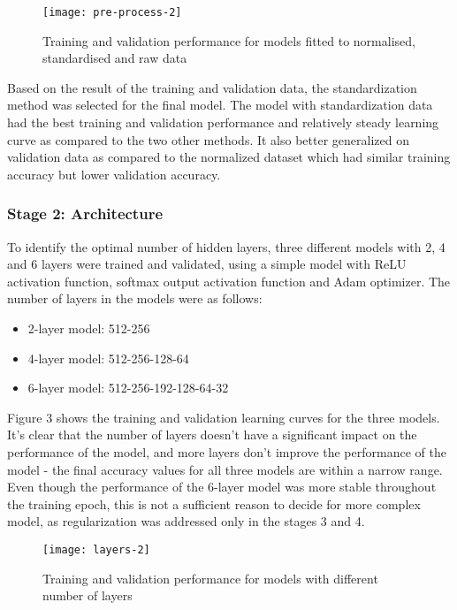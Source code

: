 \documentclass[]{article}
\providecommand{\tightlist}{%
  \setlength{\itemsep}{0pt}\setlength{\parskip}{0pt}}
\begin{document}
\begin{figure}

{\centering \texttt{[image: pre-process-2]} 

}

\caption{Training and validation performance for models fitted to normalised, standardised and raw data}\label{fig:unnamed-chunk-2}
\end{figure}

Based on the result of the training and validation data, the
standardization method was selected for the final model. The model with
standardization data had the best training and validation performance
and relatively steady learning curve as compared to the two other
methods. It also better generalized on validation data as compared to
the normalized dataset which had similar training accuracy but lower
validation accuracy.

\hypertarget{stage-2-architecture}{%
\subsubsection{Stage 2: Architecture}\label{stage-2-architecture}}

To identify the optimal number of hidden layers, three different models
with 2, 4 and 6 layers were trained and validated, using a simple model
with ReLU activation function, softmax output activation function and
Adam optimizer. The number of layers in the models were as follows:

\begin{itemize}
\tightlist
\item
  2-layer model: 512-256
\item
  4-layer model: 512-256-128-64
\item
  6-layer model: 512-256-192-128-64-32
\end{itemize}

Figure 3 shows the training and validation learning curves for the three
models. It's clear that the number of layers doesn't have a significant
impact on the performance of the model, and more layers don't improve
the performance of the model - the final accuracy values for all three
models are within a narrow range. Even though the performance of the
6-layer model was more stable throughout the training epoch, this is not
a sufficient reason to decide for more complex model, as regularization
was addressed only in the stages 3 and 4.

\begin{figure}

{\centering \texttt{[image: layers-2]} 

}

\caption{Training and validation performance for models with different number of layers}\label{fig:unnamed-chunk-3}
\end{figure}
\end{document}
